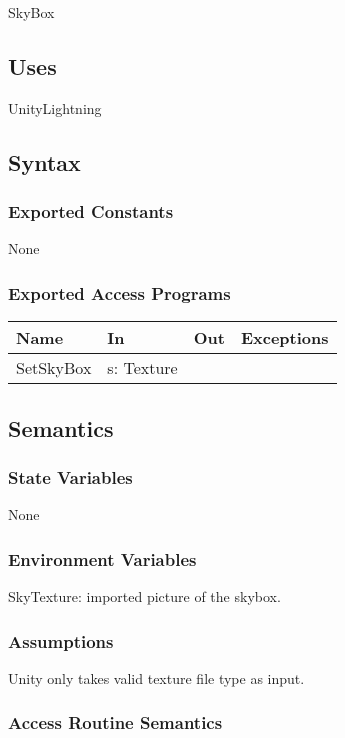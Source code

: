 \documentclass[12pt, titlepage]{article}
\begin{document}
SkyBox

\subsection{Uses}

UnityLightning

\subsection{Syntax}

\subsubsection{Exported Constants}
None
\subsubsection{Exported Access Programs}

\begin{center}
\begin{tabular}{|l| l | l | p{5cm}|}
\hline
\textbf{Name} & \textbf{In} & \textbf{Out} & \textbf{Exceptions} \\
\hline
SetSkyBox & s: Texture &  &  \\
\hline
\end{tabular}
\end{center}

\subsection{Semantics}

\subsubsection{State Variables}
None

\subsubsection{Environment Variables}

SkyTexture: imported picture of the skybox.

\subsubsection{Assumptions}

Unity only takes valid texture file type as input.

\subsubsection{Access Routine Semantics}
\end{document}

